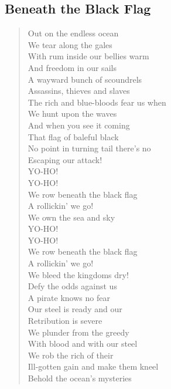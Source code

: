 \documentclass[11pt]{article}
\begin{document}
\subsection{Beneath the Black Flag}
\label{sec:orga0c7739}
\begin{verse}
Out on the endless ocean\\
We tear along the gales\\
With rum inside our bellies warm\\
And freedom in our sails\\
\vspace*{1em}
A wayward bunch of scoundrels\\
Assassins, thieves and slaves\\
The rich and blue-bloods fear us when\\
We hunt upon the waves\\
\vspace*{1em}
And when you see it coming\\
That flag of baleful black\\
No point in turning tail there's no\\
Escaping our attack!\\
YO-HO!\\
YO-HO!\\
We row beneath the black flag\\
A rollickin' we go!\\
We own the sea and sky\\
YO-HO!\\
YO-HO!\\
We row beneath the black flag\\
A rollickin' we go!\\
We bleed the kingdoms dry!\\
\vspace*{1em}
Defy the odds against us\\
A pirate knows no fear\\
Our steel is ready and our\\
Retribution is severe\\
\vspace*{1em}
We plunder from the greedy\\
With blood and with our steel\\
We rob the rich of their\\
Ill-gotten gain and make them kneel\\
\vspace*{1em}
Behold the ocean's mysteries\\

\end{verse}
\end{document}
